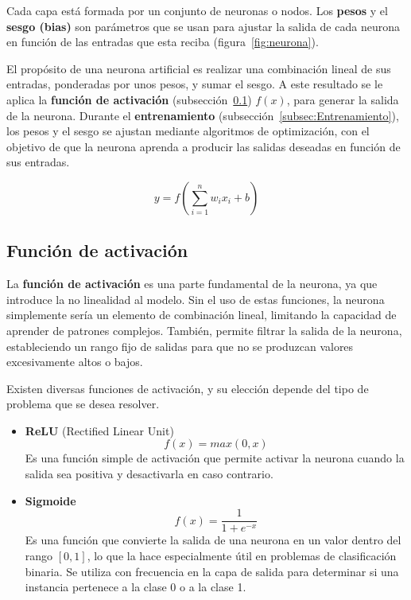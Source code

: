 
Cada capa está formada por un conjunto de neuronas o nodos. Los \textbf{pesos} y el \textbf{sesgo (bias)} son parámetros que se usan para ajustar la salida de cada neurona en función de las entradas que esta reciba (figura~\ref{fig:neurona}).


El propósito de una neurona artificial es realizar una combinación lineal de sus entradas, ponderadas por unos pesos, y sumar el sesgo. A este resultado se le aplica la \textbf{función de activación} (subsección~\ref{subsec:FuncionActivacion}) \(f(x)\), para generar la salida de la neurona. Durante el \textbf{entrenamiento} (subsección~\ref{subsec:Entrenamiento}), los pesos y el sesgo se ajustan mediante algoritmos de optimización, con el objetivo de que la neurona aprenda a producir las salidas deseadas en función de sus entradas.

\[y=f(\sum_{i=1}^{n}{w_ix_i + b})\]

\subsection{Función de activación}
\label{subsec:FuncionActivacion}
La \textbf{función de activación} es una parte fundamental de la neurona, ya que introduce la no linealidad al modelo. Sin el uso de estas funciones, la neurona simplemente sería un elemento de combinación lineal, limitando la capacidad de aprender de patrones complejos. También, permite filtrar la salida de la neurona, estableciendo un rango fijo de salidas para que no se produzcan valores excesivamente altos o bajos.

Existen diversas funciones de activación, y su elección depende del tipo de problema que se desea resolver.
\begin{itemize}
    \item \textbf{ReLU} (Rectified Linear Unit)
        \[f(x)=max(0, x)\]
        Es una función simple de activación que permite activar la neurona cuando la salida sea positiva y desactivarla en caso contrario.
    \item \textbf{Sigmoide}
        \[f(x)=\frac{1}{1 + e^{-x}}\]
        Es una función que convierte la salida de una neurona en un valor dentro del rango \([0,1]\), lo que la hace especialmente útil en problemas de clasificación binaria. Se utiliza con frecuencia en la capa de salida para determinar si una instancia pertenece a la clase 0 o a la clase 1.
\end{itemize}

